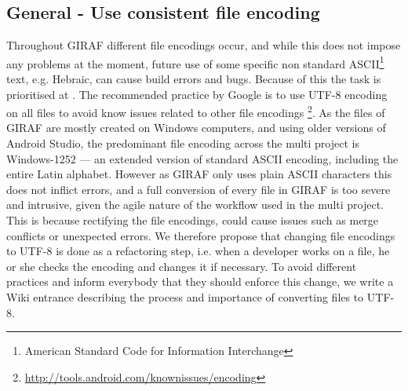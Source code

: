 \subsection{General - Use consistent file encoding}
Throughout GIRAF different file encodings occur, and while this does not impose any problems at the moment, future use of some specific non standard ASCII\footnote{American Standard Code for Information Interchange} text, e.g. Hebraic, can cause build errors and bugs.
Because of this the task is prioritised at \phigh.
The recommended practice by Google is to use UTF-8 encoding on all files to avoid know issues related to other file encodings \footnote{\url{http://tools.android.com/knownissues/encoding}}.
As the files of GIRAF are mostly created on Windows computers, and using older versions of Android Studio, the predominant file encoding across the multi project is Windows-1252 --- an extended version of standard ASCII encoding, including the entire Latin alphabet.
However as GIRAF only uses plain ASCII characters this does not inflict errors, and a full conversion of every file in GIRAF is too severe and intrusive, given the agile nature of the workflow used in the multi project.
This is because rectifying the file encodings, could cause issues such as merge conflicts or unexpected errors. 
We therefore propose that changing file encodings to UTF-8 is done as a refactoring step, i.e. when a developer works on a file, he or she checks the encoding and changes it if necessary.
To avoid different practices and inform everybody that they should enforce this change, we write a Wiki entrance describing the process and importance of converting files to UTF-8.
